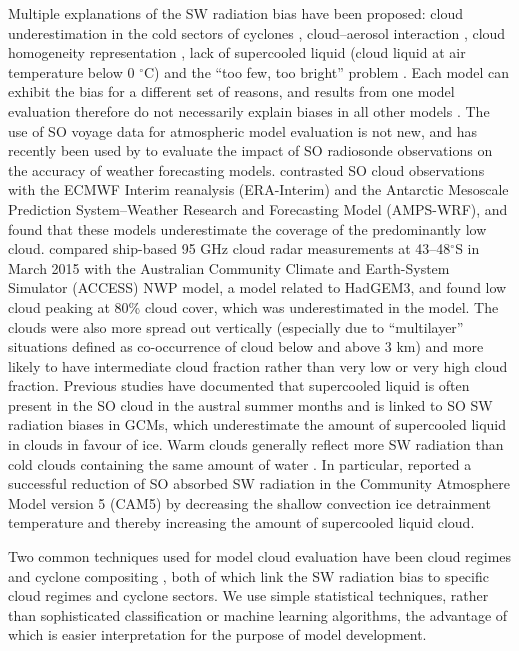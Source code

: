 Multiple explanations of the SW radiation bias have been proposed: cloud
underestimation in the cold sectors of cyclones \citep{bodas-salcedo2014},
cloud--aerosol interaction \citep{vergara-temprado2018}, cloud homogeneity
representation \citep{loveridge2018}, lack of supercooled liquid (cloud liquid
at air temperature below 0 $^\circ$C) \citep{kay2016,bodas-salcedo2016} and the
``too few, too bright'' problem \citep{nam2012,klein2013,wall2017}. Each model
can exhibit the bias for a different set of reasons, and results from one model
evaluation therefore do not necessarily explain biases in all other models
\citep{mason2015}. The use of SO voyage data for atmospheric model evaluation
is not new, and has recently been used by \cite{sato2018} to evaluate the
impact of SO radiosonde observations on the accuracy of weather forecasting
models. \cite{klekociuk2018} contrasted SO cloud observations with the ECMWF
Interim reanalysis (ERA-Interim) and the Antarctic Mesoscale Prediction
System--Weather Research and Forecasting Model (AMPS-WRF), and found that these
models underestimate the coverage of the predominantly low cloud.
\cite{protat2017} compared ship-based 95 GHz cloud radar measurements at
43--48$^\circ$S in March 2015 with the Australian Community Climate and
Earth-System Simulator (ACCESS) NWP model, a model related to HadGEM3, and
found low cloud peaking at 80\% cloud cover, which was underestimated in the
model. The clouds were also more spread out vertically (especially due to
``multilayer'' situations defined as co-occurrence of cloud below and above 3
km) and more likely to have intermediate cloud fraction rather than very low or
very high cloud fraction. Previous studies have documented that supercooled
liquid is often present in the SO cloud in the austral summer months
\citep{morrison2011,huang2012,chubb2013,huang2016,bodas-salcedo2016,jolly2018}
and is linked to SO SW radiation biases in GCMs, which underestimate the amount
of supercooled liquid in clouds in favour of ice. Warm clouds generally reflect
more SW radiation than cold clouds containing the same amount of water
\citep{vergara-temprado2018}. In particular, \cite{kay2016} reported a
successful reduction of SO absorbed SW radiation in the Community Atmosphere
Model version 5 (CAM5) by decreasing the shallow convection ice detrainment
temperature and thereby increasing the amount of supercooled liquid cloud.

Two common techniques used for model cloud evaluation have been cloud regimes
\citep{williams2009,haynes2011,mason2014,mason2015,mcdonald2016,jin2017,mcdonald2018,schuddeboom2018a,schuddeboom2019}
and cyclone compositing
\citep{bodas-salcedo2012,williams2013,bodas-salcedo2014,bodas-salcedo2016,williams2017},
both of which link the SW radiation bias to specific cloud regimes and cyclone
sectors. We use simple statistical techniques, rather than sophisticated
classification or machine learning algorithms, the advantage of which is easier
interpretation for the purpose of model development.

